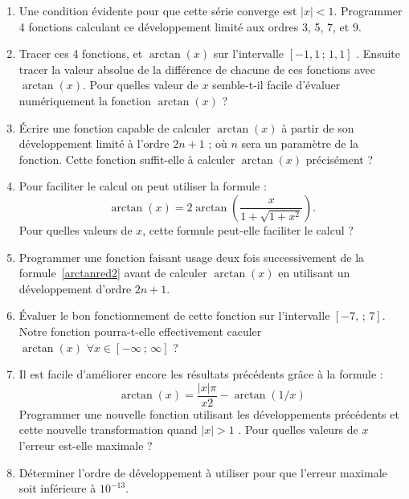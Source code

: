 \begin{enumerate}
\item Une condition évidente pour que cette série converge est $|x|<1$.
 Programmer 4 fonctions calculant ce développement limité aux ordres 3, 5, 7, et 9. 
\item Tracer ces 4 fonctions, et $\arctan(x)$ 
sur l'intervalle $[-1,1\,;\,1,1]$ .
Ensuite tracer la valeur absolue de la différence 
de chacune de ces fonctions avec $\arctan(x)$. 
Pour quelles valeur de $x$ semble-t-il facile 
d'évaluer numériquement la fonction $\arctan(x)$ ? 
\item Écrire une fonction capable de calculer $\arctan(x)$ à partir de 
son développement limité à l'ordre $2n+1$ ; où $n$ 
sera un paramètre de la fonction.
Cette fonction suffit-elle à calculer $\arctan(x)$ précisément ? 
\item Pour faciliter le calcul on peut utiliser la formule : 
\begin{equation}\label{arctanred2}
\arctan(x) = 2 \arctan\left(\frac{x}{1+\sqrt{1+x^2}}\right).
\end{equation}
Pour quelles valeurs de $x$, cette formule peut-elle faciliter le calcul ? 
\item Programmer une fonction faisant usage 
deux fois successivement de la formule~\ref{arctanred2} 
avant de calculer $\arctan(x)$ en utilisant 
un développement d'ordre $2n+1$. 
\item Évaluer le bon fonctionnement de cette fonction sur 
l'intervalle $[-7,\,;\,7]$. Notre fonction pourra-t-elle effectivement 
caculer $\arctan(x) \,\, \forall x \in [-\infty\,;\,\infty]$ ?
\item Il est facile d'améliorer encore les résultats précédents 
grâce à la formule : 
\begin{equation}
\arctan(x) = \frac{|x|\pi}{x2}-\arctan(1/x) 
\end{equation}
Programmer une nouvelle fonction utilisant les développements précédents et
cette nouvelle transformation quand $|x|>1$ . Pour 
quelles valeurs de $x$ l'erreur est-elle maximale ? 
\item Déterminer l'ordre de développement à utiliser pour que 
l'erreur maximale soit inférieure à $10^{-13}$.
\end{enumerate}

